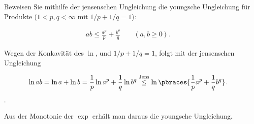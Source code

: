 
\begin{exercise}

Beweisen Sie mithilfe der jensenschen Ungleichung die youngsche Ungleichung für Produkte ($1 < p, q < \infty$ mit $1/p + 1/q = 1$):

\begin{align*}
    ab
    \leq
    \frac{a^p}{p} + \frac{b^q}{q}
    \qquad
    (a, b \geq 0).
\end{align*}

\end{exercise}


\begin{solution}

Wegen der Konkavität des $\ln$, und $1/p + 1/q = 1$, folgt mit der jensenschen Ungleichung

\begin{align*}
    \ln{ab}
    =
    \ln{a} + \ln{b}
    =
    \frac{1}{p} \ln{a^p}
    +
    \frac{1}{q} \ln{b^q}
    \stackrel{\text{Jens}}{\leq}
    \ln
    {
        \pbraces
        {
            \frac{1}{p} a^p
            +
            \frac{1}{q} b^q
        }
    }.
\end{align*}.

Aus der Monotonie der $\exp$ erhält man daraus die youngsche Ungleichung.

\end{solution}

